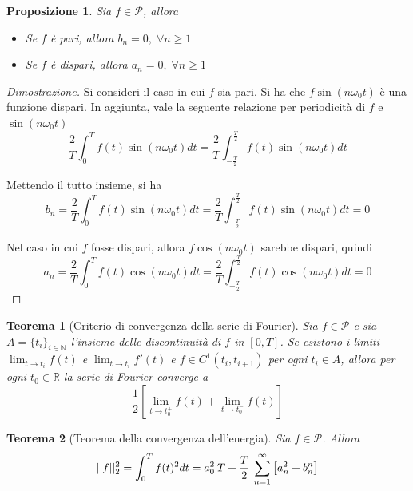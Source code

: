\documentclass{article}
\newtheorem{theorem}{Teorema}
\newtheorem{proposition}{Proposizione}
\begin{document}
    \begin{proposition}
        Sia $f \in \mathcal{P}$, allora
        \begin{itemize}
            \item Se $f$ è pari, allora $b_{n} = 0, \; \forall n \geq 1$
            \item Se $f$ è dispari, allora $a_{n} = 0, \; \forall n \geq 1$
        \end{itemize}
    \end{proposition}

    \begin{proof}[Dimostrazione]
        Si consideri il caso in cui $f$ sia pari. 
        Si ha che $f \sin(n\omega_{0}t)$ è una funzione dispari.
        In aggiunta, vale la seguente relazione per periodicità di $f$ e $\sin(n\omega_{0}t)$ 
        \[
            \frac{2}{T} \int_{0}^{T} f(t)\sin(n \omega_{0} t) dt = \frac{2}{T} \int_{-\frac{T}{2}}^{\frac{T}{2}} f(t)\sin(n \omega_{0} t) dt
        \]

        Mettendo il tutto insieme, si ha
        \[
            b_{n} = \frac{2}{T} \int_{0}^{T} f(t)\sin(n \omega_{0} t) dt = \frac{2}{T} \int_{-\frac{T}{2}}^{\frac{T}{2}} f(t)\sin(n \omega_{0} t) dt = 0
        \]

        Nel caso in cui $f$ fosse dispari, allora $f \cos(n \omega_{0} t)$ sarebbe dispari, quindi 
        \[
            a_{n} = \frac{2}{T} \int_{0}^{T} f(t)\cos(n \omega_{0} t) dt = \frac{2}{T} \int_{-\frac{T}{2}}^{\frac{T}{2}} f(t)\cos(n \omega_{0} t) dt = 0
        \]
    \end{proof}

    \begin{theorem}[Criterio di convergenza della serie di Fourier]
        Sia $f \in \mathcal{P}$ e sia $A = \{t_{i}\}_{i \in \mathbb{N}}$ l'insieme delle discontinuità di $f$ in $[0, T]$.
        Se esistono i limiti $\displaystyle \lim_{t \rightarrow t_{i}} f(t)$ e $\displaystyle \lim_{t \rightarrow t_{i}} f'(t)$ e $f \in C^{1}(t_{i}, t_{i + 1})$ per ogni $t_{i} \in A$, allora per ogni $t_{0} \in \mathbb{R}$ la serie di Fourier converge a
        \[
            \frac{1}{2} \left[ \lim_{t \rightarrow t_{0}^{+}} f(t) + \lim_{t \rightarrow t_{0}^{-}} f(t) \right]
        \]
    \end{theorem}

    \begin{theorem}[Teorema della convergenza dell'energia]
        Sia $f \in \mathcal{P}$. Allora
        \[
            ||f||^{2}_{2} = \int_{0}^{T} f(t)^{2} dt = a_{0}^{2} \: T + \frac{T}{2} \: \sum_{n = 1}^{\infty} \qty[a_{n}^{2} + b_{n}^{n}]
        \]
    \end{theorem}
\end{document}
